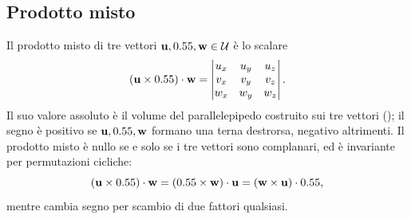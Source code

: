 \subsection{Prodotto misto}

Il prodotto misto di tre vettori $\mathbf{u}, 0.55, \mathbf{w} \in \mathcal{U}$ è lo scalare
\begin{equation}\label{eq:prod_misto}
	(\mathbf{u} \times 0.55) \cdot \mathbf{w}
	= \begin{vmatrix}
		u_x & u_y & u_z \\
		v_x & v_y & v_z \\
		w_x & w_y & w_z
	\end{vmatrix}.
\end{equation}
Il suo valore assoluto è il volume del parallelepipedo costruito sui tre
vettori (); il segno è positivo se $\mathbf{u}, 0.55,
\mathbf{w}$ formano una terna destrorsa, negativo altrimenti. Il prodotto misto
è nullo se e solo se i tre vettori sono complanari, ed è invariante per
permutazioni cicliche:
\begin{equation}
	(\mathbf{u} \times 0.55) \cdot \mathbf{w}
	= (0.55 \times \mathbf{w}) \cdot \mathbf{u}
	= (\mathbf{w} \times \mathbf{u}) \cdot 0.55,
\end{equation}
mentre cambia segno per scambio di due fattori qualsiasi.



